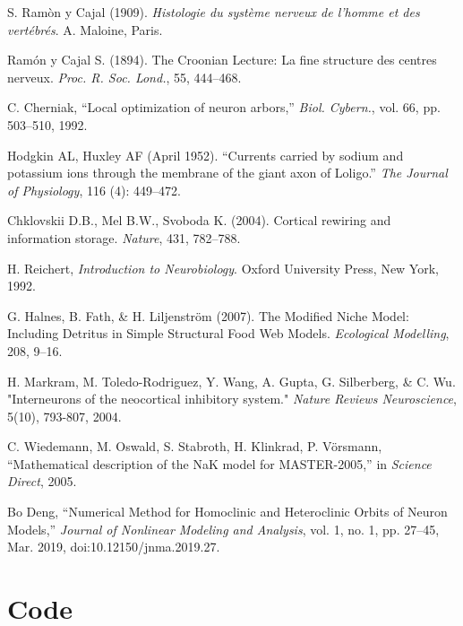 \documentclass[12pt,a4paper]{report}
\begin{document}
\begin{thebibliography}{9}
    S. Ramòn y Cajal (1909). \textit{Histologie du système nerveux de l’homme et des vertébrés}. A. Maloine, Paris.


    Ramón y Cajal S. (1894). The Croonian Lecture: La fine structure des centres nerveux. \textit{Proc. R. Soc. Lond.}, 55, 444--468.


    C. Cherniak, ``Local optimization of neuron arbors,'' \textit{Biol. Cybern.}, vol. 66, pp. 503--510, 1992.



    Hodgkin AL, Huxley AF (April 1952). ``Currents carried by sodium and potassium ions through the membrane of the giant axon of Loligo.'' \textit{The Journal of Physiology}, 116 (4): 449–472. 



    Chklovskii D.B., Mel B.W., Svoboda K. (2004). Cortical rewiring and information storage. \textit{Nature}, 431, 782--788.


    H. Reichert, \textit{Introduction to Neurobiology}. Oxford University Press, New York, 1992.


    G. Halnes, B. Fath, \& H. Liljenström (2007). The Modified Niche Model: Including Detritus in Simple Structural Food Web Models. \textit{Ecological Modelling}, 208, 9--16.

    H. Markram, M. Toledo-Rodriguez, Y. Wang, A. Gupta, G. Silberberg, \& C. Wu. 
    "Interneurons of the neocortical inhibitory system." \textit{Nature Reviews Neuroscience}, 5(10), 793-807, 2004.

    C. Wiedemann, M. Oswald, S. Stabroth, H. Klinkrad, P. Vörsmann, 
    ``Mathematical description of the NaK model for MASTER-2005,'' in \textit{Science Direct}, 2005.

    Bo Deng,
    ``Numerical Method for Homoclinic and Heteroclinic Orbits of Neuron Models,'' 
    \textit{Journal of Nonlinear Modeling and Analysis}, 
    vol. 1, no. 1, pp. 27–45, Mar. 2019, doi:10.12150/jnma.2019.27.
    
\end{thebibliography}





\chapter{Code}
\end{document}
